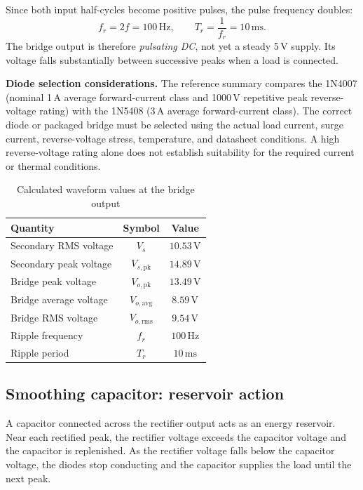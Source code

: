\documentclass[journal,12pt,twocolumn]{IEEEtran}
\begin{document}
Since both input half-cycles become positive pulses, the pulse
frequency doubles:
\begin{equation}
    \boxed{f_r=2f=100\,\mathrm{Hz},\qquad
    T_r=\frac{1}{f_r}=10\,\mathrm{ms}.}
    \label{eq:ripple-frequency}
\end{equation}
The bridge output is therefore \emph{pulsating DC}, not yet a steady
5\,V supply. Its voltage falls substantially between successive
peaks when a load is connected.

\textbf{Diode selection considerations.} The reference summary
compares the 1N4007 (nominal 1\,A average forward-current class and
1000\,V repetitive peak reverse-voltage rating) with the 1N5408
(3\,A average forward-current class). The correct diode or packaged
bridge must be selected using the actual load current, surge current,
reverse-voltage stress, temperature, and datasheet conditions.
A high reverse-voltage rating alone does not establish suitability
for the required current or thermal conditions.

\begin{table}[!t]
\centering
\caption{Calculated waveform values at the bridge output}
\label{tab:bridge-results}
\small
\begin{tabular}{|p{}|c|c|}
\hline
\textbf{Quantity} & \textbf{Symbol} & \textbf{Value}\\ \hline
Secondary RMS voltage & $V_s$ & $10.53\,\mathrm{V}$\\ \hline
Secondary peak voltage & $V_{s,\mathrm{pk}}$ & $14.89\,\mathrm{V}$\\ \hline
Bridge peak voltage & $V_{o,\mathrm{pk}}$ & $13.49\,\mathrm{V}$\\ \hline
Bridge average voltage & $V_{o,\mathrm{avg}}$ & $8.59\,\mathrm{V}$\\ \hline
Bridge RMS voltage & $V_{o,\mathrm{rms}}$ & $9.54\,\mathrm{V}$\\ \hline
Ripple frequency & $f_r$ & $100\,\mathrm{Hz}$\\ \hline
Ripple period & $T_r$ & $10\,\mathrm{ms}$\\ \hline
\end{tabular}
\end{table}

\subsection*{Smoothing capacitor: reservoir action}
A capacitor connected across the rectifier output acts as an energy
reservoir. Near each rectified peak, the rectifier voltage exceeds
the capacitor voltage and the capacitor is replenished. As the
rectifier voltage falls below the capacitor voltage, the diodes stop
conducting and the capacitor supplies the load until the next peak.
\end{document}
